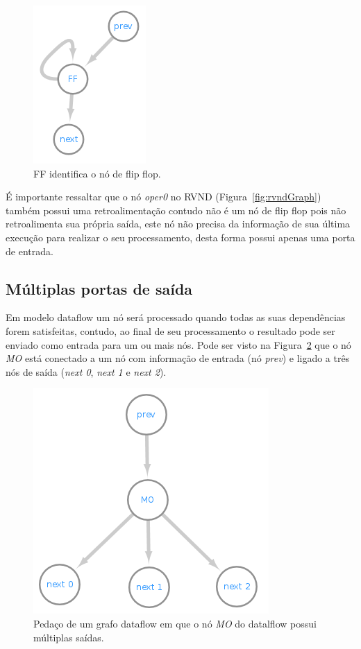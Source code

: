 \begin{figure}[htbp]
    \centerline{\includegraphics[scale=1.0]{figuras/dataflow/Flip_flop.png}}
    \caption{FF identifica o nó de flip flop.}
    \label{fig:flipFlop}
\end{figure}

É importante ressaltar que o nó \textit{oper0} no RVND (Figura~\ref{fig:rvndGraph}) também possui uma retroalimentação contudo não é um nó de flip flop pois não retroalimenta sua própria saída, este nó não precisa da informação de sua última execução para realizar o seu processamento, desta forma possui apenas uma porta de entrada.

\subsection{Múltiplas portas de saída}\label{subsec:multiplasSaidas}

Em modelo dataflow um nó será processado quando todas as suas dependências forem satisfeitas, contudo, ao final de seu processamento o resultado pode ser enviado como entrada para um ou mais nós.
Pode ser visto na Figura~\ref{fig:dataflowMo0} que o nó \textit{MO} está conectado a um nó com informação de entrada (nó \textit{prev}) e ligado a três nós de saída (\textit{next 0}, \textit{next 1} e \textit{next 2}).

\begin{figure}[htbp]
    \centerline{\includegraphics[scale=0.9]{figuras/dataflow/multi_output0.png}}
    \caption{Pedaço de um grafo dataflow em que o nó \textit{MO} do datalflow possui múltiplas saídas.}
    \label{fig:dataflowMo0}
\end{figure}

